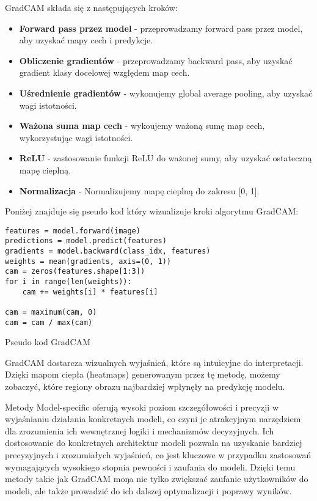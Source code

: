 GradCAM składa się z następujących kroków:
\begin{itemize}
	\item \textbf{Forward pass przez model} - przeprowadzamy forward pass przez model, aby uzyskać mapy cech i predykcje.
	\item \textbf{Obliczenie gradientów} - przeprowadzamy backward pass, aby uzyskać gradient klasy docelowej względem map cech.
	\item \textbf{Uśrednienie gradientów} - wykonujemy global average pooling, aby uzyskać wagi istotności.
	\item \textbf{Ważona suma map cech} - wykoujemy ważoną sumę map cech, wykorzystując wagi istotności.
	\item \textbf{ReLU} - zastosowanie funkcji ReLU do ważonej sumy, aby uzyskać ostateczną mapę cieplną.
	\item \textbf{Normalizacja} - Normalizujemy mapę cieplną do zakresu [0, 1].
\end{itemize}

Poniżej znajduje się pseudo kod który wizualizuje kroki algorytmu GradCAM:

\begin{listing}
	\begin{verbatim}
features = model.forward(image)
predictions = model.predict(features)
gradients = model.backward(class_idx, features)
weights = mean(gradients, axis=(0, 1))
cam = zeros(features.shape[1:3])
for i in range(len(weights)):
    cam += weights[i] * features[i]

cam = maximum(cam, 0)
cam = cam / max(cam)
    \end{verbatim}
	\caption{Pseudo kod GradCAM} \label{listing:gradcam}
\end{listing}

GradCAM dostarcza  wizualnych wyjaśnień, które są intuicyjne do interpretacji.
Dzięki mapom ciepła (heatmaps) generowanym przez tę metodę, możemy zobaczyć, które regiony obrazu najbardziej wpłynęły na predykcję modelu.

\vspace{1cm}

Metody Model-specific oferują wysoki poziom szczegółowości i precyzji w wyjaśnianiu działania konkretnych modeli, co czyni je atrakcyjnym narzędziem dla zrozumienia ich wewnętrznej logiki i mechanizmów decyzyjnych.
Ich dostosowanie do konkretnych architektur modeli pozwala na uzyskanie bardziej precyzyjnych i zrozumiałych wyjaśnień, co jest kluczowe w przypadku zastosowań wymagających wysokiego stopnia pewności i zaufania do modeli.
Dzięki temu metody takie jak GradCAM moŋa nie tylko zwiększać zaufanie użytkowników do modeli, ale także prowadzić do ich dalszej optymalizacji i poprawy wyników.

